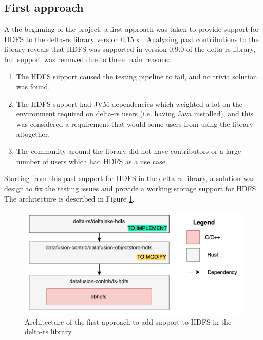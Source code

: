 \subsection{First approach}
A the beginning of the project, a first approach was taken to provide support for \gls{HDFS} to the delta-rs library version 0.15.x . Analyzing past contributions to the library reveals that \gls{HDFS} was supported in version 0.9.0 of the delta-rs library, but support was removed due to three main reasons:
\begin{enumerate}
  \item The \gls{HDFS} support caused the testing pipeline to fail, and no trivia solution was found.
  \item The \gls{HDFS} support had \gls{JVM} dependencies which weighted a lot on the environment required on delta-rs users (i.e. having Java installed), and this was considered a requirement that would some users from using the library altogether.
  \item The community around the library did not have contributors or a large number of users which had \gls{HDFS} as a use case.
\end{enumerate}
Starting from this past support for \gls{HDFS} in the delta-rs library, a solution was design to fix the testing issues and provide a working storage support for \gls{HDFS}. The architecture is described in Figure \ref{fig:approach_1_solution_schema}. 

\begin{figure}[!ht]
  \begin{center}
    \includegraphics[width=\textwidth]{figures/4-implementation/approach1_solution_schema.png}
  \caption{Architecture of the first approach to add support to \gls{HDFS} in the delta-rs library.}
  \label{fig:approach_1_solution_schema}
  \end{center}
\end{figure}


